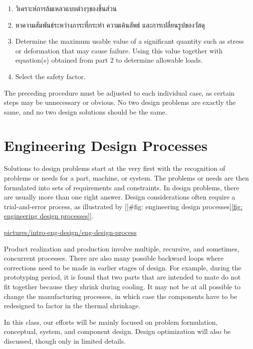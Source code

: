 \documentclass[a4paper,openany,12pt]{book}
\begin{document}
\begin{enumerate}
\item วิเคราะห์การล้มเหลวแบบต่างๆของชิ้นส่วน

\item หาความสัมพันธ์ระหว่างภาระที่กระทำ ความเค้นลัพธ์ และการเปลี่ยนรูปของวัสดุ

\item Determine the maximum usable value of a significant quantity such as
stress or deformation that may cause failure. Using this value
together with equation(s) obtained from part 2 to determine allowable
loads.

\item Select the safety factor.
\end{enumerate}

The preceding procedure must be adjusted to each individual case, as
certain steps may be unnecessary or obvious. No two design problems are
exactly the same, and no two design solutions should be the same.

\section{Engineering Design Processes}
\label{engineering-design-processes}
Solutions to design problems start at the very first with the
recognition of problems or needs for a part, machine, or system. The
problems or needs are then formulated into sets of requirements and
constraints. In design problems, there are usually more than one right
answer. Design considerations often require a trial-and-error process,
as illustrated by
[[\#fig: engineering design processes]\ref{fig: engineering design processes}].


\url{pictures/intro-eng-design/eng-design-process}

Product realization and production involve multiple, recursive, and
sometimes, concurrent processes. There are also many possible backward
loops where corrections need to be made in earlier stages of design. For
example, during the prototyping period, it is found that two parts that
are intended to mate do not fit together because they shrink during
cooling. It may not be at all possible to change the manufacturing
processes, in which case the components have to be redesigned to factor
in the thermal shrinkage.

In this class, our efforts will be mainly focused on problem
formulation, conceptual, system, and component design. Design
optimization will also be discussed, though only in limited details.
\end{document}
